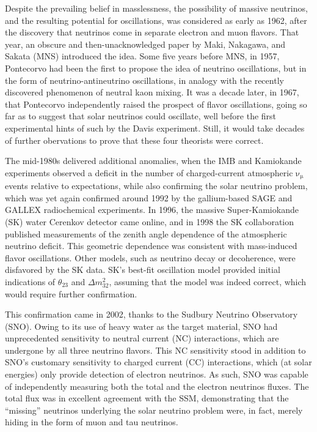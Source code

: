 \documentclass[../thesis.tex]{subfiles}
\begin{document}
Despite the prevailing belief in masslessness, the possibility of massive
neutrinos, and the resulting potential for oscillations, was considered as early
as 1962, after the discovery that neutrinos come in separate electron and muon
flavors. That year, an obscure and then-unacknowledged paper by Maki, Nakagawa,
and Sakata (MNS) introduced the idea. Some five years before MNS, in 1957,
Pontecorvo had been the first to propose the idea of neutrino oscillations, but
in the form of neutrino-antineutrino oscillations, in analogy with the recently
discovered phenomenon of neutral kaon mixing. It was a decade later, in 1967,
that Pontecorvo independently raised the prospect of flavor oscillations, going
so far as to suggest that solar neutrinos could oscillate, well before the first
experimental hints of such by the Davis experiment. Still, it would take decades
of further obervations to prove that these four theorists were correct.

The mid-1980s delivered additional anomalies, when the IMB and Kamiokande
experiments observed a deficit in the number of charged-current atmospheric
$\mathrm{\nu_\mu}$ events relative to expectations, while also confirming the
solar neutrino problem, which was yet again confirmed around 1992 by the
gallium-based SAGE and GALLEX radiochemical experiments. In 1996, the massive
Super-Kamiokande (SK) water Cerenkov detector came online, and in 1998 the SK
collaboration published measurements of the zenith angle dependence of the
atmospheric neutrino deficit. This geometric dependence was consistent with
mass-induced flavor oscillations. Other models, such as neutrino decay or
decoherence, were disfavored by the SK data. SK's best-fit oscillation model
provided initial indications of $\theta_{23}$ and $\Delta m^2_{32}$, assuming
that the model was indeed correct, which would require further confirmation.

This confirmation came in 2002, thanks to the Sudbury Neutrino Observatory
(SNO). Owing to its use of heavy water as the target material, SNO had
unprecedented sensitivity to neutral current (NC) interactions, which are
undergone by all three neutrino flavors. This NC sensitivity stood in addition
to SNO's customary sensitivity to charged current (CC) interactions, which (at
solar energies) only provide detection of electron neutrinos. As such, SNO was
capable of independently measuring both the total and the electron neutrinos
fluxes. The total flux was in excellent agreement with the SSM, demonstrating
that the ``missing'' neutrinos underlying the solar neutrino problem were, in
fact, merely hiding in the form of muon and tau neutrinos.
\end{document}
